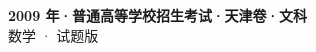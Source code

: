 \documentclass[zihao=-4, a4paper]{ctexart}
\begin{document}
\begin{center}
  {\Large\bfseries 2009 年·普通高等学校招生考试·天津卷·文科}\\[4pt]
  {\large 数学 · 试题版}
\end{center}
\medskip
{}

\end{document}
